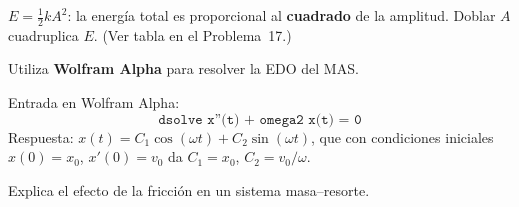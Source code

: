 \documentclass[12pt, a4paper, oneside]{book}
\begin{document}
\begin{solucion}
$E = \tfrac{1}{2}kA^{2}$: la energ\'ia total es proporcional al \textbf{cuadrado}
de la amplitud. Doblar $A$ cuadruplica $E$. (Ver tabla en el Problema~17.)
\end{solucion}

\begin{problema}[title={Problema~25}]
Utiliza \textbf{Wolfram Alpha} para resolver la EDO del MAS.
\end{problema}

\begin{solucion}
Entrada en Wolfram Alpha:
\[
  \texttt{dsolve x''(t) + omega\^{}2 x(t) = 0}
\]
Respuesta: $x(t) = C_{1}\cos(\omega t) + C_{2}\sin(\omega t)$,
que con condiciones iniciales $x(0)=x_{0}$, $x'(0)=v_{0}$ da
$C_{1}=x_{0}$, $C_{2}=v_{0}/\omega$.
\end{solucion}

\begin{problema}[title={Problema~26}]
Explica el efecto de la fricci\'on en un sistema masa--resorte.
\end{problema}
\end{document}
